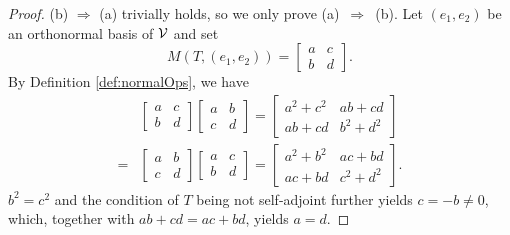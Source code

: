 \begin{proof}
  (b) $\Rightarrow$ (a) trivially holds,
  so we only prove \mbox{(a) $\Rightarrow$ (b)}.
  Let $(e_1,e_2)$ be an orthonormal basis of ${\cal V}$
  and set 
  \begin{displaymath}
    M(T,(e_1,e_2)) =
    \begin{bmatrix}
      a & c
      \\
      b & d
    \end{bmatrix}.
  \end{displaymath}
  By Definition \ref{def:normalOps}, we have
  \begin{align*}
    &
    \begin{bmatrix}
      a & c
      \\
      b & d
    \end{bmatrix}
    \begin{bmatrix}
      a & b
      \\
      c & d
    \end{bmatrix}
          =
    \begin{bmatrix}
      a^2+c^2 & ab+cd
      \\
      ab+cd & b^2+d^2
    \end{bmatrix}
    \\
    =&
    \begin{bmatrix}
      a & b
      \\
      c & d
    \end{bmatrix}
    \begin{bmatrix}
      a & c
      \\
      b & d
    \end{bmatrix}
    =
    \begin{bmatrix}
      a^2+b^2 & ac+bd
      \\
      ac+bd & c^2+d^2
    \end{bmatrix}.
  \end{align*}
  $b^2=c^2$
  and the condition of $T$ being not self-adjoint
  further yields
  $c=-b \ne 0$,
  which, together with $ab+cd=ac+bd$,
  yields $a=d$.
\end{proof}


